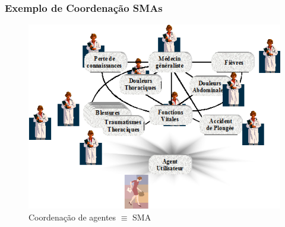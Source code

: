 
\begin{frame}
\frametitle{Exemplo de Coordenação SMAs}

\begin{figure}[!ht]
\centering
\includegraphics[height =.6\textheight,width=.7\textwidth]{figuras/coordenacao_agentes02.png}
\caption{Coordenação de agentes $\equiv $   SMA}
\end{figure}
 
\end{frame}


